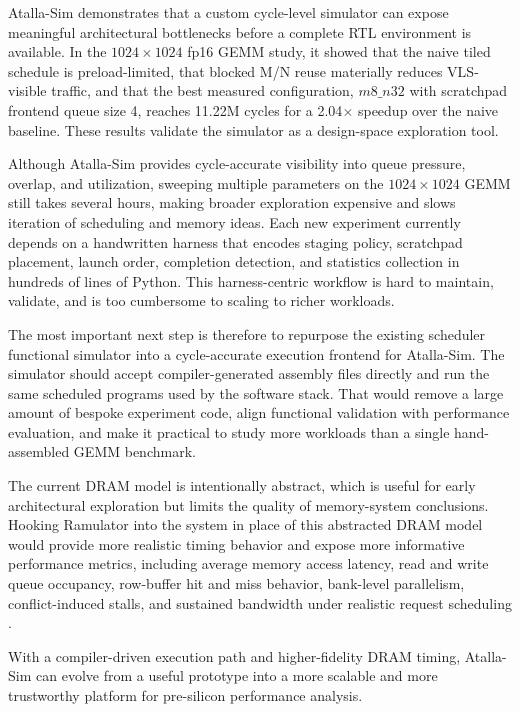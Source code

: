 Atalla-Sim demonstrates that a custom cycle-level simulator can expose meaningful architectural bottlenecks before a complete RTL environment is available. In the $1024 \times 1024$ fp16 GEMM study, it showed that the naive tiled schedule is preload-limited, that blocked M/N reuse materially reduces VLS-visible traffic, and that the best measured configuration, $m8\_n32$ with scratchpad frontend queue size 4, reaches 11.22M cycles for a 2.04$\times$ speedup over the naive baseline. These results validate the simulator as a design-space exploration tool.

Although Atalla-Sim provides cycle-accurate visibility into queue pressure, overlap, and utilization, sweeping multiple parameters on the $1024 \times 1024$ GEMM still takes several hours, making broader exploration expensive and slows iteration of scheduling and memory ideas. Each new experiment currently depends on a handwritten harness that encodes staging policy, scratchpad placement, launch order, completion detection, and statistics collection in hundreds of lines of Python. This harness-centric workflow is hard to maintain, validate, and is too cumbersome to scaling to richer workloads.

The most important next step is therefore to repurpose the existing scheduler functional simulator into a cycle-accurate execution frontend for Atalla-Sim. The simulator should accept compiler-generated assembly files directly and run the same scheduled programs used by the software stack. That would remove a large amount of bespoke experiment code, align functional validation with performance evaluation, and make it practical to study more workloads than a single hand-assembled GEMM benchmark.

The current DRAM model is intentionally abstract, which is useful for early architectural exploration but limits the quality of memory-system conclusions. Hooking Ramulator into the system in place of this abstracted DRAM model would provide more realistic timing behavior and expose more informative performance metrics, including average memory access latency, read and write queue occupancy, row-buffer hit and miss behavior, bank-level parallelism, conflict-induced stalls, and sustained bandwidth under realistic request scheduling \cite{ramulator}.

With a compiler-driven execution path and higher-fidelity DRAM timing, Atalla-Sim can evolve from a useful prototype into a more scalable and more trustworthy platform for pre-silicon performance analysis.
